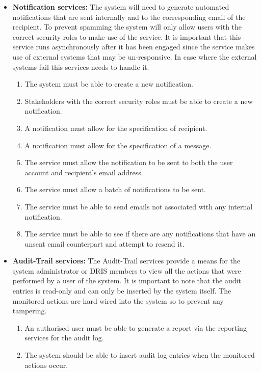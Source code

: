 \documentclass[12pt]{article}
\begin{document}
\begin{itemize}
		\item\textbf{Notification services:}
		The system will need to generate automated notifications that are sent internally and to the corresponding email of the recipient. To prevent spamming the system will only allow users with the correct security roles to make use of the service. It is important that this service runs asynchronously after it has been engaged since the service makes use of external systems that may be un-responsive. In case where the external systems fail this services needs to handle it. 
		\begin{enumerate}
			\item The system must be able to create a new notification.
			\item Stakeholders with the correct security roles must be able to create a new notification.
			\item A notification must allow for the specification of recipient.
			\item A notification must allow for the specification of a message.
			\item The service must allow the notification to be sent to both the user account and recipient's email address.
			\item The service must allow a batch of notifications to be sent.
			\item The service must be able to send emails not associated with any internal notification.
			\item The service must be able to see if there are any notifications that have an unsent email counterpart and attempt to resend it.
		\end{enumerate}

		\item\textbf{Audit-Trail services:}
		The Audit-Trail services provide a means for the system administrator or DRIS members to view all the actions that were performed by a user of the system. It is important to note that the audit entries is read-only and can only be inserted by the system itself. The monitored actions are hard wired into the system so to prevent any tampering.
		\begin{enumerate}
			\item An authorised user must be able to generate a report via the reporting services for the audit log.
			\item The system should be able to insert audit log entries when the monitored actions occur.
		\end{enumerate}
		

\end{itemize}
\end{document}

